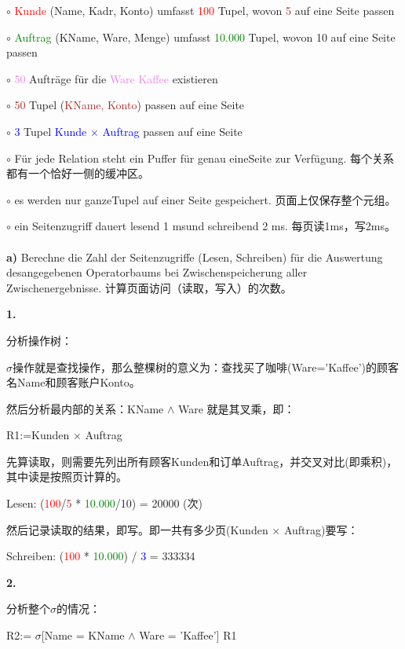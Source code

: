 \documentclass[fleqn]{article}
\begin{document}
$\circ$ \textcolor{red}{Kunde} (Name, Kadr, Konto) umfasst \textcolor{red}{100} Tupel, wovon \textcolor{brown}{5} auf eine Seite passen

$\circ$ \textcolor{green}{Auftrag} (KName, Ware, Menge) umfasst \textcolor{green}{10.000} Tupel, wovon \textcolor[RGB]{84,139,84}{10} auf eine Seite passen  

$\circ$ \textcolor{violet}{50} Aufträge für die \textcolor{violet}{Ware Kaffee} existieren

$\circ$ \textcolor{brown}{50} Tupel (\textcolor{brown}{KName, Konto}) passen auf eine Seite

$\circ$ \textcolor{blue}{3} Tupel \textcolor{blue}{Kunde $\times$ Auftrag} passen auf eine Seite

$\circ$ Für jede Relation steht ein Puffer für genau eineSeite zur Verfügung. 每个关系都有一个恰好一侧的缓冲区。

$\circ$ es werden nur ganzeTupel auf einer Seite gespeichert. 页面上仅保存整个元组。

$\circ$ ein Seitenzugriff dauert lesend 1 msund schreibend 2 ms. 每页读1ms，写2ms。
\\
\\
\textbf{a)} Berechne die Zahl der Seitenzugriffe (Lesen, Schreiben) für die Auswertung desangegebenen Operatorbaums bei Zwischenspeicherung aller Zwischenergebnisse.
计算页面访问（读取，写入）的次数。

\textbf{1.} 

分析操作树：

$\sigma$操作就是查找操作，那么整棵树的意义为：查找买了咖啡(Ware='Kaffee')的顾客名Name和顾客账户Konto。

然后分析最内部的关系：KName $\wedge$ Ware 就是其叉乘，即：

R1:=Kunden $\times$ Auftrag

先算读取，则需要先列出所有顾客Kunden和订单Auftrag，并交叉对比(即乘积)，其中读是按照页计算的。

Lesen: (\textcolor{red}{100}/\textcolor{brown}{5} * \textcolor{green}{10.000}/\textcolor[RGB]{84,139,84}{10}) = 20000 (次)

然后记录读取的结果，即写。即一共有多少页(Kunden $\times$ Auftrag)要写：

Schreiben: (\textcolor{red}{100} * \textcolor{green}{10.000}) / \textcolor{blue}{3} = 333334

\textbf{2.}

分析整个$\sigma$的情况：

R2:= $\sigma$[Name = KName $\wedge$ Ware = 'Kaffee'] R1  
\end{document}
